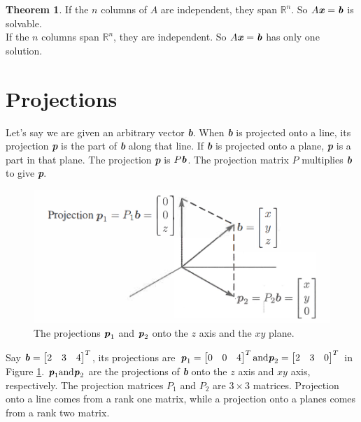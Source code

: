 \documentclass[12pt, letterpaper]{article}
\newcommand{\R}[1]{$\mathbb{R}^{#1}$}
\newcommand{\V}[1]{\textbf{\textit{#1}}}
\newcommand{\DefinitionSpace}{\vspace{15px}}
\theoremstyle{definition}
\newtheorem{theorem}{Theorem}
\begin{document}
	\begin{theorem}
		If the $n$ columns of $A$ are independent, they span \R{n}. So $A\V{x} = \V{b}$ is solvable.\\
		If the $n$ columns span \R{n}, they are independent. So $A\V{x} = \V{b}$ has only one solution.
	\end{theorem}\DefinitionSpace 
	
	
	
\section{Projections}
	Let's say we are given an arbitrary vector \V{b}. When \V{b} is projected onto a line, its projection \V{p} is the part of \V{b} along that line. If \V{b} is projected onto a plane, \V{p} is a part in that plane. The projection \V{p} is $P\V{b}$. The projection matrix $P$ multiplies \V{b} to give \V{p}.
	
	\begin{figure}[h!]
		\centering
		\includegraphics[scale=0.5]{projection.png}
		\caption{The projections $\V{p}_1$ and $\V{p}_2$ onto the $z$ axis and the $xy$ plane.}
		\label{projection}
	\end{figure}
	
	Say $\V{b} = \begin{bmatrix} 2 & 3 & 4\end{bmatrix}^T$, its projections are $\V{p}_1=\begin{bmatrix} 0 & 0 & 4\end{bmatrix}^T \text{and} \V{p}_2=\begin{bmatrix} 2 & 3 & 0\end{bmatrix}^T$ in Figure \ref{projection}. $\V{p}_1 \text{and} \V{p}_2$ are the projections of \V{b} onto the $z$ axis and $xy$ axis, respectively. The projection matrices $P_1$ and $P_2$ are $3 \times 3$ matrices. Projection onto a line comes from a rank one matrix, while a projection onto a planes comes from a rank two matrix.
	
\end{document}
